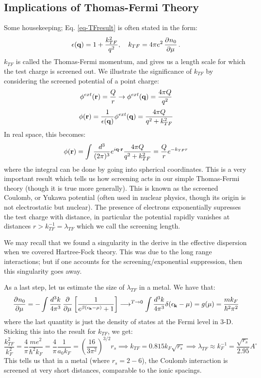 \subsection{Implications of Thomas-Fermi Theory}
Some housekeeping; Eq. \eqref{eq-TFresult} is often stated in the form:
\begin{equation}
    \e(\v{q}) = 1 + \frac{k_{TF}^2}{q^2}, \quad k_{TF} = 4\pi e^2\dpd{n_0}{\mu}.
\end{equation}
$k_{TF}$ is called the Thomas-Fermi momentum, and gives us a length scale for which the test charge is screened out. We illustrate the significance of $k_{TF}$ by considering the screened potential of a point charge:
\begin{equation}
    \phi^{ext}(\mathbf{r}) = \frac{Q}{r} \to \phi^{ext}(\mathbf{q}) = \frac{4\pi Q}{q^2}
\end{equation}
\begin{equation}
    \phi(\mathbf{r}) = \frac{1}{\epsilon(\mathbf{q})}\phi^{ext}(\mathbf{q}) = \frac{4\pi Q}{q^2 + k_{TF}^2}
\end{equation}
In real space, this becomes:
\begin{equation}
    \phi(\mathbf{r}) = \int \frac{d^3}{(2\pi)^3}e^{i\mathbf{q} \cdot \mathbf{r}}\frac{4\pi Q}{q^2 + k_{TF}^2} = \frac{Q}{r}e^{-k_{TF}r}
\end{equation}
where the integral can be done by going into spherical coordinates. This is a very important result which tells us how screening acts in our simple Thomas-Fermi theory (though it is true more generally). This is known as the screened Coulomb, or Yukawa potential (often used in nuclear physics, though its origin is not electrostatic but nuclear). The presence of electrons exponentially supresses the test charge with distance, in particular the potential rapidly vanishes at distances $r > k_{TF}^{-1} = \lambda_{TF}$ which we call the screening length.

We may recall that we found a singularity in the derive in the effective dispersion when we covered Hartree-Fock theory. This was due to the long range interactions; but if one accounts for the screening/exponential suppression, then this singularity goes away.

As a last step, let us estimate the size of $\lambda_{TF}$ in a metal. We have that:
\begin{equation}
    \dpd{n_0}{\mu} = -\int \frac{d^3k}{4\pi^3}\dpd{}{\mu}\left[\frac{1}{e^{\beta(\e_\v{k} - \mu)} + 1}\right] \longrightarrow^{T \to 0} \int \frac{d^3k}{4\pi^3}\delta(\e_{\v{k}} - \mu) = g(\mu) = \frac{mk_F}{\hbar^2 \pi^2}
\end{equation}
where the last quantity is just the density of states at the Fermi level in 3-D. Sticking this into the result for $k_{TF}$, we get:
\begin{equation}
    \frac{k_{TF}^2}{k_F^2} = \frac{4}{\pi}\frac{me^2}{\hbar^2k_F} = \frac{4}{\pi} \frac{1}{a_0k_F} = \left(\frac{16}{3\pi^2}\right)^{3/2}r_s \implies k_{TF} = 0.815k_F\sqrt{r_s} \implies \lambda_{TF} \approx k_{F}^{-1} = \frac{\sqrt{r_s}}{2.95}A^{\circ}
\end{equation}
This tells us that in a metal (where $r_s = 2-6$), the Coulomb interaction is screened at very short distances, comparable to the ionic spacings.

